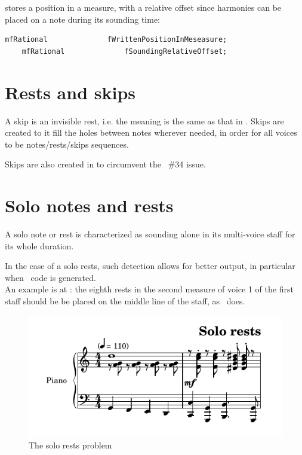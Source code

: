  stores a position in a measure, with a relative offset since harmonies can be placed on a note during its sounding time:
\begin{lstlisting}[language=CPlusPlus]
    mfRational              fWrittenPositionInMeseasure;
    mfRational              fSoundingRelativeOffset;
\end{lstlisting}


\section{Rests and skips}\label{Rests and skips}

A skip is an invisible rest, i.e. the meaning is the same as that in \lily. Skips are created to {it fill the holes} between notes wherever needed, in order for all voices to be notes/rests/skips sequences.

Skips are also created in \msrToLpsr{} to circumvent the \lily\ \#34 issue.


\section{Solo notes and rests}\label{Solo notes and rests}

A solo note or rest is characterized as sounding alone in its multi-voice staff for its whole duration.

In the case of a solo rests, such detection allows for better output, in particular when \lily\ code is generated.\\
An example is at  : the eighth rests in the second measure of voice 1 of the first staff should be be placed on the middle line of the staff, as \mscore\ does.
\begin{figure}[htbp]
\begin{center}
\includegraphics{../mfgraphics/mfgraphicsTheSoloRestsProblem.png}

\caption{The solo rests problem}
\label{The solo rests problem}
\end{center}
\end{figure}


